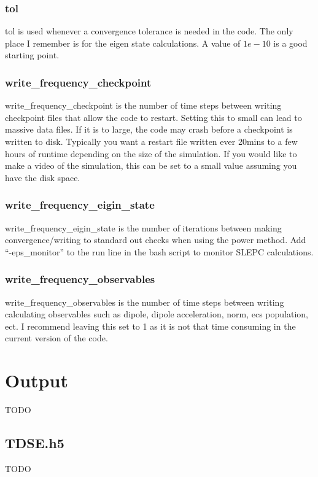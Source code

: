 \documentclass{article}
\begin{document}
\subsubsection{tol}
tol is used whenever a convergence tolerance is needed in the code. The only place I remember is for the eigen state calculations. A value of $1e-10$ is a good starting point.

\subsubsection{write\_frequency\_checkpoint}
write\_frequency\_checkpoint is the number of time steps between writing checkpoint files that allow the code to restart. Setting this to small can lead to massive data files. If it is to large, the code may crash before a checkpoint is written to disk. Typically you want a restart file written ever 20mins to a few hours of runtime depending on the size of the simulation. If you would like to make a video of the simulation, this can be set to a small value assuming you have the disk space.

\subsubsection{write\_frequency\_eigin\_state}
write\_frequency\_eigin\_state is the number of iterations between making convergence/writing to standard out checks when using the power method. Add ``-eps\_monitor'' to the run line in the bash script to monitor SLEPC calculations.

\subsubsection{write\_frequency\_observables}
write\_frequency\_observables is the number of time steps between writing calculating observables such as dipole, dipole acceleration, norm, ecs population, ect. I recommend leaving this set to 1 as it is not that time consuming in the current version of the code.


\section{Output} %
\label{sec:output}
TODO

\subsection{TDSE.h5} %
\label{sub:tdse_h5}
TODO
\end{document}
